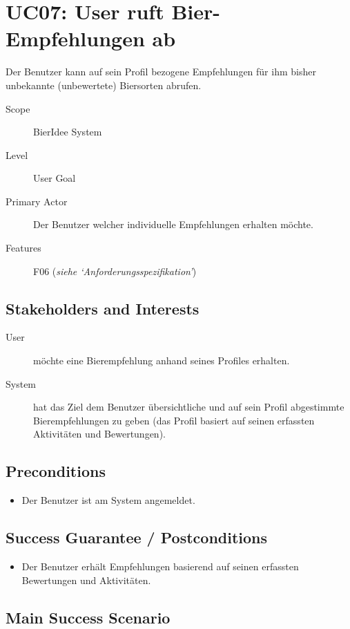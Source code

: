 \documentclass[10pt,a4paper]{scrartcl}
\begin{document}
\section*{UC07: User ruft Bier-Empfehlungen ab}
Der Benutzer kann auf sein Profil bezogene Empfehlungen für ihm bisher unbekannte (unbewertete) Biersorten abrufen.

\begin{description}
\item[Scope] BierIdee System
\item[Level] User Goal
\item[Primary Actor] Der Benutzer welcher individuelle Empfehlungen erhalten möchte.
\item[Features] F06 (\textit{siehe `Anforderungsspezifikation'})
\end{description}


\subsection*{Stakeholders and Interests}

\begin{description}
\item[User] möchte eine Bierempfehlung anhand seines Profiles erhalten.
\item[System] hat das Ziel dem Benutzer übersichtliche und auf sein Profil abgestimmte  Bierempfehlungen zu geben (das Profil basiert auf seinen erfassten Aktivitäten und Bewertungen).
\end{description}


\subsection*{Preconditions}

\begin{itemize}
\item Der Benutzer ist am System angemeldet.
\end{itemize}


\subsection*{Success Guarantee / Postconditions}
\begin{itemize}
\item Der Benutzer erhält Empfehlungen basierend auf seinen erfassten Bewertungen und Aktivitäten.
\end{itemize}


\subsection*{Main Success Scenario}
\end{document}
